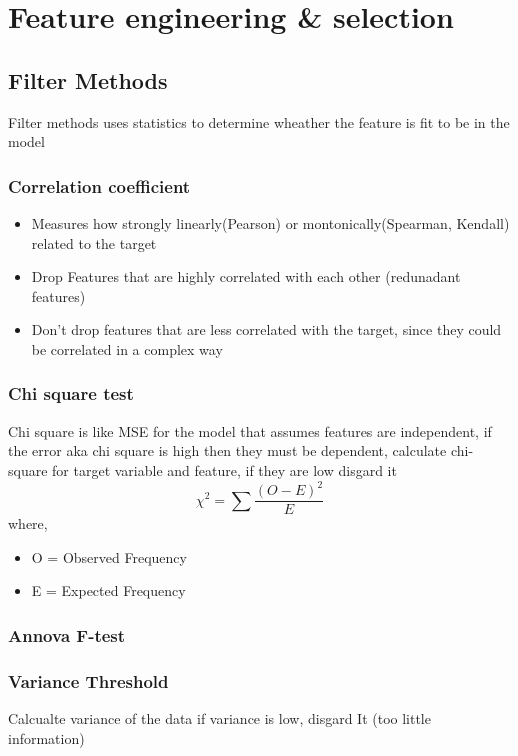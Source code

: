 \documentclass[12pt]{extarticle}
\begin{document}
\section{Feature engineering \& selection}

\subsection{Filter Methods}
Filter methods uses statistics to determine wheather the feature is fit to be
in the model 

\subsubsection{Correlation coefficient}
\begin{itemize}
    \item Measures how strongly linearly(Pearson) or montonically(Spearman, Kendall) related
to the target
    \item Drop Features that are highly correlated with each other (redunadant features)
    \item Don't drop features that are less correlated with the target, since they could be 
        correlated in a complex way 
\end{itemize}

\subsubsection{Chi square test}
Chi square is like MSE for the model that assumes features are independent, 
if the error aka chi square is high then they must be dependent, calculate
chi-square for target variable and feature, if they are low disgard it
$$ \chi^2 = \sum \frac{(O-E)^2}{E} $$
where,
\begin{itemize}
    \item O = Observed Frequency
    \item E = Expected Frequency 
\end{itemize}

\subsubsection{Annova F-test}



\subsubsection{Variance Threshold}
Calcualte variance of the data if variance is low, disgard It
(too little information)
\end{document}
